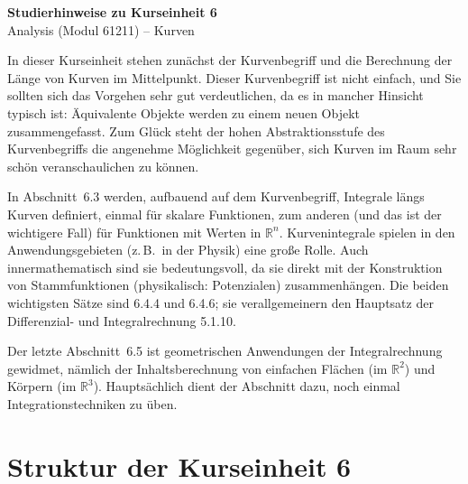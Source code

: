 \documentclass[a4paper,12pt]{article}
\begin{document}
\begin{center}
  {\LARGE\bfseries Studierhinweise zu Kurseinheit 6}\\[0.5em]
  {\large Analysis (Modul 61211) -- Kurven}
\end{center}

\vspace{1em}

In dieser Kurseinheit stehen zunächst der Kurvenbegriff und die Berechnung
der Länge von Kurven im Mittelpunkt. Dieser Kurvenbegriff ist nicht einfach,
und Sie sollten sich das Vorgehen sehr gut verdeutlichen, da es in mancher
Hinsicht typisch ist: Äquivalente Objekte werden zu einem neuen Objekt
zusammengefasst. Zum Glück steht der hohen Abstraktionsstufe des Kurvenbegriffs
die angenehme Möglichkeit gegenüber, sich Kurven im Raum sehr schön
veranschaulichen zu können.

In Abschnitt~6.3 werden, aufbauend auf dem Kurvenbegriff, Integrale längs
Kurven definiert, einmal für skalare Funktionen, zum anderen (und das ist
der wichtigere Fall) für Funktionen mit Werten in $\mathbb{R}^n$.
Kurvenintegrale spielen in den Anwendungsgebieten (z.\,B.\ in der Physik)
eine große Rolle. Auch innermathematisch sind sie bedeutungsvoll, da sie
direkt mit der Konstruktion von Stammfunktionen (physikalisch: Potenzialen)
zusammenhängen. Die beiden wichtigsten Sätze sind 6.4.4 und 6.4.6; sie
verallgemeinern den Hauptsatz der Differenzial- und Integralrechnung 5.1.10.

Der letzte Abschnitt~6.5 ist geometrischen Anwendungen der Integralrechnung
gewidmet, nämlich der Inhaltsberechnung von einfachen Flächen (im
$\mathbb{R}^2$) und Körpern (im $\mathbb{R}^3$). Hauptsächlich dient der
Abschnitt dazu, noch einmal Integrationstechniken zu üben.

\section*{Struktur der Kurseinheit 6}
\end{document}
